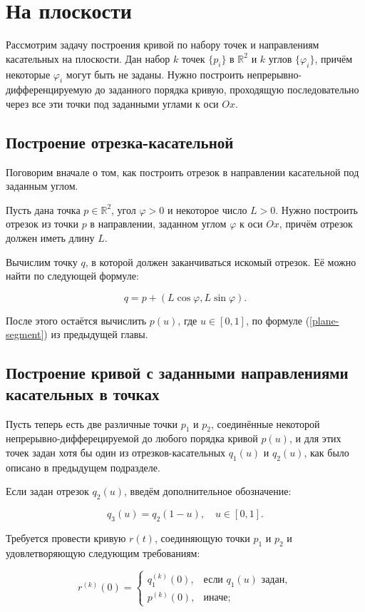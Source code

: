 \section{На плоскости}

Рассмотрим задачу построения кривой по набору точек и направлениям касательных на плоскости. Дан набор $k$ точек
$\{p_i\}$ в $\mathbb{R}^2$ и $k$ углов $\{\varphi_i\}$, причём некоторые $\varphi_i$ могут быть не заданы. Нужно построить
непрерывно-дифференцируе\-мую до заданного порядка кривую, проходящую последовательно через все эти точки под заданными
углами к оси $Ox$.

\subsection*{Построение отрезка-касательной}

Поговорим вначале о том, как построить отрезок в направлении касательной под заданным углом.

Пусть дана точка $p \in \mathbb{R}^2$, угол $\varphi>0$ и некоторое число $L>0$. Нужно построить отрезок из точки $p$
в направлении, заданном углом $\varphi$ к оси $Ox$, причём отрезок должен иметь длину $L$.

Вычислим точку $q$, в которой должен заканчиваться искомый отрезок. Её можно найти по следующей формуле:

$$
q=p+(L\cos\varphi,L\sin\varphi).
$$

После этого остаётся вычислить $p(u)$, где $u \in [0,1]$, по формуле (\ref{plane-segment}) из предыдущей главы.

\subsection*{Построение кривой с заданными направлениями \mbox{касательных} в точках}

Пусть теперь есть две различные точки $p_1$ и $p_2$, соединённые некоторой непре\-рывно-дифферецируемой до любого
порядка кривой $p(u)$, и для этих точек задан хотя бы один из отрезков-касательных $q_1(u)$ и $q_2(u)$, как было описано
в предыдущем подразделе.

Если задан отрезок $q_2(u)$, введём дополнительное обозначение:

$$
q_3(u)=q_2(1-u), \quad u \in [0,1].
$$

Требуется провести кривую $r(t)$, соединяющую точки $p_1$ и $p_2$ и удовлетворяющую следующим требованиям:

\begin{equation*}
r^{(k)}(0)=
  \begin{cases}
    q_1^{(k)}(0), & \text{если $q_1(u)$ задан}, \\
    p^{(k)}(0),   & \text{иначе};
  \end{cases}
\end{equation*}

